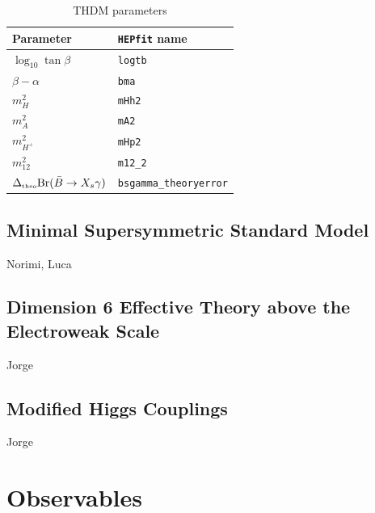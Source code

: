 \documentclass[aps,superscriptaddress,nofootinbib,floatfix,notitlepage]{revtex4-1}
\newcommand{\HEPfit}{\texttt{HEPfit}\xspace}
\begin{document}
\begin{table}[tb]
 \centering
 \caption{THDM parameters}\vspace{0.2cm}
  \begin{tabular}{|l|l|}
    \hline
      \textbf{Parameter} & \textbf{\HEPfit name} \\
    \hline
      $\log_{10}\tan\beta$ & \tt{logtb}\\
    \hline
      $\beta-\alpha$ & \tt{bma}\\
    \hline
      $m_H^2$ & \tt{mHh2}\\
    \hline
      $m_A^2$ & \tt{mA2}\\
    \hline
      $m_{H^+}^2$ & \tt{mHp2}\\
    \hline
      $m_{12}^2$ & \tt{m12\_2}\\
    \hline
      $\Delta _{\text{\tiny{theo}}}{\rm Br}(\bar{B}\to X_s\gamma)$ & \tt{bsgamma\_theoryerror}\\
    \hline
  \end{tabular}
 \label{tab:HandAsearchlimits}
\end{table} 

\subsection{Minimal Supersymmetric Standard Model}
\label{sec:MSSM}

Norimi, Luca

\subsection{Dimension 6 Effective Theory above the Electroweak Scale }
\label{sec:Dim6}

Jorge

\subsection{Modified Higgs Couplings}
\label{sec:Higgs}

Jorge



\section{Observables}
\label{sec:Observables}
\end{document}
